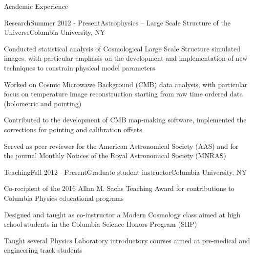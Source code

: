 \documentclass{resume} %
\begin{document}

\begin{rSection}{Academic Experience}

\begin{rSubsection}{Research}{Summer 2012 - Present}{Astrophysics -- Large Scale Structure of the Universe}{Columbia University, NY}
\item Conducted statistical analysis of Cosmological Large Scale Structure simulated images, with particular emphasis on the development and implementation of new techniques to constrain physical model parameters
\item Worked on Cosmic Microwawe Background (CMB) data analysis, with particular focus on temperature image reconstruction starting from raw time ordered data (bolometric and pointing) 
\item Contributed to the development of CMB map-making software, implemented the corrections for pointing and calibration offsets
\item Served as peer reviewer for the American Astronomical Society (AAS) and for the journal Monthly Notices of the Royal Astronomical Society (MNRAS)
\end{rSubsection}


\begin{rSubsection}{Teaching}{Fall 2012 - Present}{Graduate student instructor}{Columbia University, NY}
\item Co-recipient of the 2016 Allan M. Sachs Teaching Award for contributions to Columbia Physics educational programs 
\item Designed and taught as co-instructor a Modern Cosmology class aimed at high school students in the Columbia Science Honors Program (SHP) 
\item Taught several Physics Laboratory introductory courses aimed at pre-medical and engineering track students  
\end{rSubsection}

\end{rSection}

\end{document}
